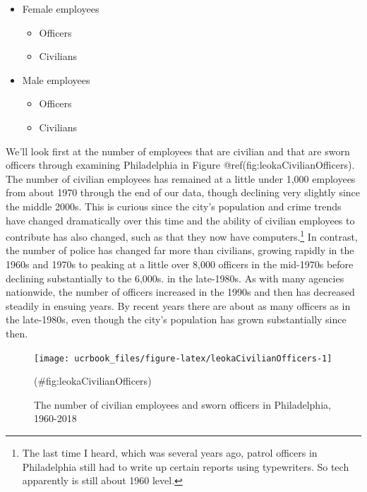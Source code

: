 \documentclass[
  12pt,
  openany]{book}
\providecommand{\tightlist}{%
  \setlength{\itemsep}{0pt}\setlength{\parskip}{0pt}}
\begin{document}
\begin{itemize}
\tightlist
\item
  Female employees

  \begin{itemize}
  \tightlist
  \item
    Officers
  \item
    Civilians
  \end{itemize}
\item
  Male employees

  \begin{itemize}
  \tightlist
  \item
    Officers
  \item
    Civilians
  \end{itemize}
\end{itemize}

We'll look first at the number of employees that are civilian and that are sworn officers through examining Philadelphia in Figure @ref(fig:leokaCivilianOfficers). The number of civilian employees has remained at a little under 1,000 employees from about 1970 through the end of our data, though declining very slightly since the middle 2000s. This is curious since the city's population and crime trends have changed dramatically over this time and the ability of civilian employees to contribute has also changed, such as that they now have computers.\footnote{The last time I heard, which was several years ago, patrol officers in Philadelphia still had to write up certain reports using typewriters. So tech apparently is still about 1960 level.} In contrast, the number of police has changed far more than civilians, growing rapidly in the 1960s and 1970s to peaking at a little over 8,000 officers in the mid-1970s before declining substantially to the 6,000s. in the late-1980s. As with many agencies nationwide, the number of officers increased in the 1990s and then has decreased steadily in ensuing years. By recent years there are about as many officers as in the late-1980s, even though the city's population has grown substantially since then.

\begin{figure}

{\centering \texttt{[image: ucrbook\_files/figure-latex/leokaCivilianOfficers-1]} 

}

\caption{The number of civilian employees and sworn officers in Philadelphia, 1960-2018}(\#fig:leokaCivilianOfficers)
\end{figure}
\end{document}
